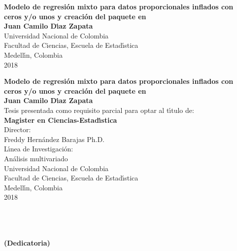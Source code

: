 \begin{center}
\begin{figure}
\centering%
%
\end{figure}
\thispagestyle{empty} \vspace*{2.0cm} \textbf{\huge
Modelo de regresi\'{o}n mixto para datos proporcionales inflados con ceros y/o unos y creaci\'{o}n del paquete  en }\\[5.5cm]
\Large\textbf{Juan Camilo D\'{\i}az Zapata}\\[5.5cm]
\small Universidad Nacional de Colombia\\
Facultad de Ciencias, Escuela de Estad\'{\i}stica\\
Medell\'{\i}n, Colombia\\
2018\\
\end{center}

\newpage{\pagestyle{empty}\cleardoublepage}

\newpage
\begin{center}
\thispagestyle{empty} \vspace*{0cm} \textbf{\huge
Modelo de regresi\'{o}n mixto para datos proporcionales inflados con ceros y/o unos y creaci\'{o}n del paquete  en }\\[3.0cm]
\Large\textbf{Juan Camilo D\'{\i}az Zapata}\\[3.0cm]
\small Tesis presentada como requisito parcial para optar al
t\'{\i}tulo de:\\
\textbf{Magister en Ciencias-Estad\'{\i}stica}\\[2.5cm]
Director:\\
Freddy Hern\'{a}ndez Barajas Ph.D.\\[2.0cm]
L\'{\i}nea de Investigaci\'{o}n:\\
An\'{a}lisis multivariado\\[2.5cm]
Universidad Nacional de Colombia\\
Facultad de Ciencias, Escuela de Estad\'{\i}stica\\
Medell\'{\i}n, Colombia\\
2018\\
\end{center}

\newpage{\pagestyle{empty}\cleardoublepage}

\newpage
\thispagestyle{empty} \textbf{}\normalsize
\\\\\\%
\textbf{(Dedicatoria)}\\[4.0cm]

